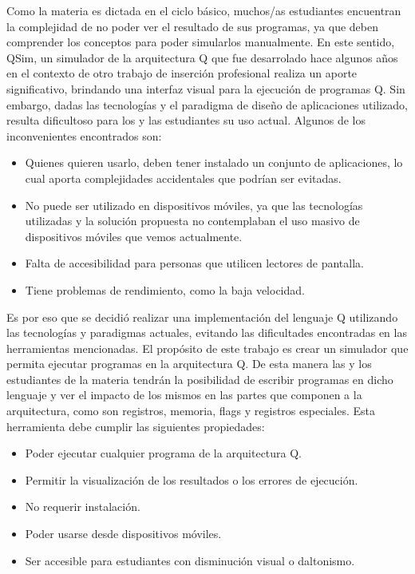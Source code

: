 Como la materia es dictada en el ciclo básico, muchos/as estudiantes encuentran la complejidad de no poder ver el resultado de sus programas, ya que deben comprender los conceptos para poder simularlos manualmente. En este sentido, QSim, un simulador de la arquitectura Q que fue desarrolado hace algunos años en el contexto de otro trabajo de inserción profesional realiza un aporte significativo, brindando una interfaz visual para la ejecución de programas Q. Sin embargo, dadas las tecnologías y el paradigma de diseño de aplicaciones utilizado, resulta dificultoso para los y las estudiantes su uso actual. Algunos de los inconvenientes encontrados son:
\begin{itemize}
\item Quienes quieren usarlo, deben tener instalado un conjunto de aplicaciones, lo cual aporta complejidades accidentales que podrían ser evitadas.
\item No puede ser utilizado en dispositivos móviles, ya que las tecnologías utilizadas y la solución propuesta no contemplaban el uso masivo de dispositivos móviles que vemos actualmente.
\item Falta de accesibilidad para personas que utilicen lectores de pantalla.
\item Tiene problemas de rendimiento, como la baja velocidad.
\end{itemize}

Es por eso que se decidió realizar una implementación del lenguaje Q utilizando las tecnologías y paradigmas actuales, evitando las dificultades encontradas en las herramientas mencionadas. El propósito de este trabajo es crear un simulador que permita ejecutar programas en la arquitectura Q. De esta manera las y los estudiantes de la materia tendrán la posibilidad de escribir programas en dicho lenguaje y ver el impacto de los mismos en las partes que componen a la arquitectura, como son registros, memoria, flags y registros especiales. Esta herramienta debe cumplir las siguientes propiedades:

\begin{itemize}
\item Poder ejecutar cualquier programa de la arquitectura Q.
\item Permitir la visualización de los resultados o los errores de ejecución.
\item No requerir instalación.
\item Poder usarse desde dispositivos móviles.
\item Ser accesible para estudiantes con disminución visual o daltonismo.
\end{itemize}


